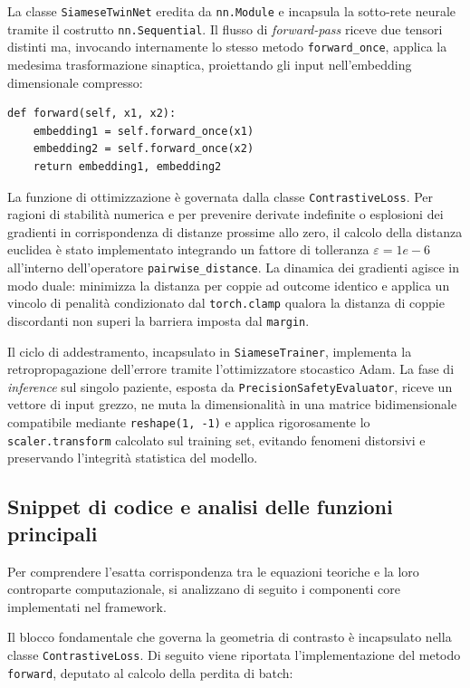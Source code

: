 \documentclass{article}
\begin{document}
La classe \texttt{SiameseTwinNet} eredita da \texttt{nn.Module} e incapsula la sotto-rete neurale tramite il costrutto \texttt{nn.Sequential}. Il flusso di \textit{forward-pass} riceve due tensori distinti ma, invocando internamente lo stesso metodo \texttt{forward\_once}, applica la medesima trasformazione sinaptica, proiettando gli input nell'embedding dimensionale compresso:
\begin{verbatim}
def forward(self, x1, x2):
    embedding1 = self.forward_once(x1)
    embedding2 = self.forward_once(x2)
    return embedding1, embedding2
\end{verbatim}

La funzione di ottimizzazione è governata dalla classe \texttt{ContrastiveLoss}. Per ragioni di stabilità numerica e per prevenire derivate indefinite o esplosioni dei gradienti in corrispondenza di distanze prossime allo zero, il calcolo della distanza euclidea è stato implementato integrando un fattore di tolleranza $\varepsilon = 1e-6$ all'interno dell'operatore \texttt{pairwise\_distance}. La dinamica dei gradienti agisce in modo duale: minimizza la distanza per coppie ad outcome identico e applica un vincolo di penalità condizionato dal \texttt{torch.clamp} qualora la distanza di coppie discordanti non superi la barriera imposta dal \texttt{margin}.

Il ciclo di addestramento, incapsulato in \texttt{SiameseTrainer}, implementa la retropropagazione dell'errore tramite l'ottimizzatore stocastico Adam. La fase di \textit{inference} sul singolo paziente, esposta da \texttt{PrecisionSafetyEvaluator}, riceve un vettore di input grezzo, ne muta la dimensionalità in una matrice bidimensionale compatibile mediante \texttt{reshape(1, -1)} e applica rigorosamente lo \texttt{scaler.transform} calcolato sul training set, evitando fenomeni distorsivi e preservando l'integrità statistica del modello.

\subsection{Snippet di codice e analisi delle funzioni principali}
Per comprendere l'esatta corrispondenza tra le equazioni teoriche e la loro controparte computazionale, si analizzano di seguito i componenti core implementati nel framework.

Il blocco fondamentale che governa la geometria di contrasto è incapsulato nella classe \texttt{ContrastiveLoss}. Di seguito viene riportata l'implementazione del metodo \texttt{forward}, deputato al calcolo della perdita di batch:
\end{document}
